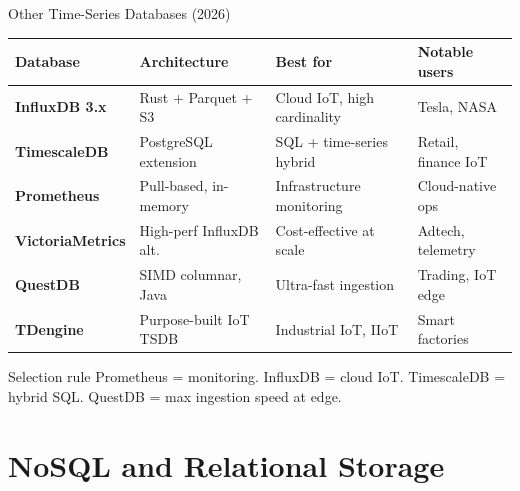 \documentclass[aspectratio=169,11pt]{beamer}
\begin{document}
\begin{frame}{Other Time-Series Databases (2026)}
    \vspace{0.05cm}
    \begin{center}
    \scriptsize
    \begin{tabular}{p{2.6cm}p{3cm}p{3cm}p{2.8cm}}
        \toprule
        \textbf{Database} & \textbf{Architecture} & \textbf{Best for} & \textbf{Notable users} \\
        \midrule
        \textbf{InfluxDB 3.x} & Rust + Parquet + S3 & Cloud IoT, high cardinality & Tesla, NASA \\
        \textbf{TimescaleDB} & PostgreSQL extension & SQL + time-series hybrid & Retail, finance IoT \\
        \textbf{Prometheus} & Pull-based, in-memory & Infrastructure monitoring & Cloud-native ops \\
        \textbf{VictoriaMetrics} & High-perf InfluxDB alt. & Cost-effective at scale & Adtech, telemetry \\
        \textbf{QuestDB} & SIMD columnar, Java & Ultra-fast ingestion & Trading, IoT edge \\
        \textbf{TDengine} & Purpose-built IoT TSDB & Industrial IoT, IIoT & Smart factories \\
        \bottomrule
    \end{tabular}
    \normalsize
    \end{center}

    \vspace{0.1cm}
    \begin{alertblock}{Selection rule}
        Prometheus = monitoring. InfluxDB = cloud IoT. TimescaleDB = hybrid SQL. QuestDB = max ingestion speed at edge.
    \end{alertblock}
\end{frame}

\section{NoSQL and Relational Storage}
\end{document}
